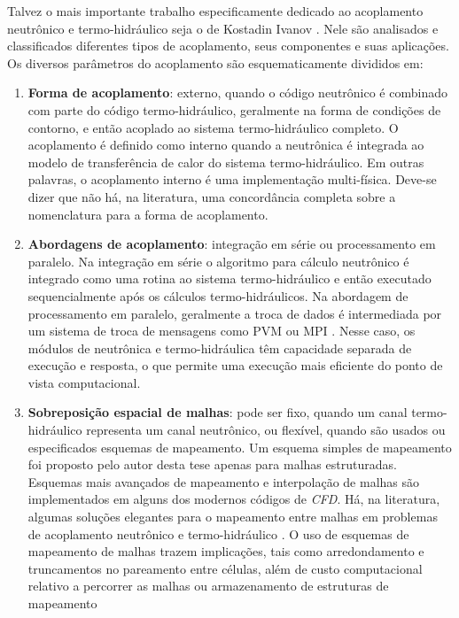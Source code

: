 Talvez o mais importante trabalho especificamente dedicado ao acoplamento 
neutrônico e termo-hidráulico seja o de Kostadin Ivanov \cite{Ivanov2007}. Nele são analisados e classificados diferentes tipos de 
acoplamento, seus componentes e suas aplicações. Os diversos parâmetros do acoplamento são esquematicamente divididos em: 
\begin{enumerate}
\item \textbf{Forma de acoplamento}: externo, quando o código neutrônico é combinado com parte do código termo-hidráulico, 
geralmente na forma de condições de contorno, e então acoplado ao sistema termo-hidráulico completo. O acoplamento 
é definido como interno quando a neutrônica é integrada ao modelo de transferência de calor do sistema termo-hidráulico. 
Em outras palavras, o acoplamento interno é uma implementação multi-física. Deve-se dizer que não há, na literatura, uma
concordância completa sobre a nomenclatura para a forma de acoplamento. 
\item \textbf{Abordagens de acoplamento}: integração em série ou processamento em paralelo. Na integração em série o algoritmo 
para cálculo neutrônico é integrado como uma rotina ao sistema termo-hidráulico e então executado sequencialmente 
após os cálculos termo-hidráulicos. Na abordagem de processamento em paralelo, geralmente a troca de dados é 
intermediada por um sistema de troca de mensagens como PVM \cite{Geist94} ou MPI \cite{Quinn2004}. Nesse caso, os 
módulos de neutrônica e termo-hidráulica têm capacidade separada de execução e resposta, o que permite uma execução 
mais eficiente do ponto de vista computacional.
\item \textbf{Sobreposição espacial de malhas}: pode ser fixo, quando um canal termo-hidráulico representa um canal neutrônico, 
  ou flexível, quando são usados ou especificados esquemas de mapeamento. Um esquema simples de mapeamento foi proposto
  pelo autor desta tese \cite{Silva2015} apenas para malhas estruturadas. Esquemas mais avançados de mapeamento 
e interpolação de malhas \cite{Beaudoin2008} são implementados em alguns dos modernos códigos de \textit{CFD}.
Há, na literatura, algumas soluções elegantes para o mapeamento entre malhas em problemas de acoplamento neutrônico
e termo-hidráulico \cite{Jareteg2015, Richard2015, Schmidt2015}. O uso de esquemas de mapeamento de malhas trazem
implicações, tais como arredondamento e truncamentos no pareamento
entre células, além de custo computacional relativo a percorrer as malhas ou armazenamento de estruturas de mapeamento

\end{enumerate}
